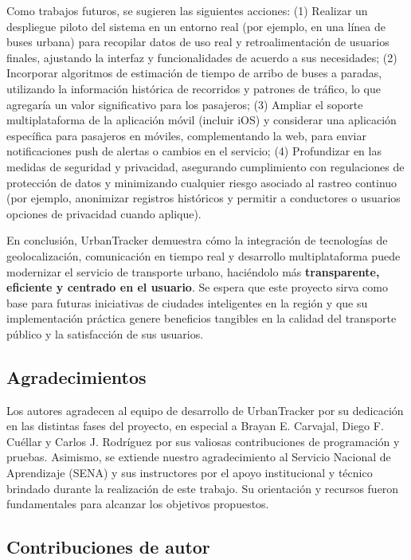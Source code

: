 \documentclass[
]{article}
\begin{document}
Como trabajos futuros, se sugieren las siguientes acciones: (1) Realizar
un despliegue piloto del sistema en un entorno real (por ejemplo, en una
línea de buses urbana) para recopilar datos de uso real y
retroalimentación de usuarios finales, ajustando la interfaz y
funcionalidades de acuerdo a sus necesidades; (2) Incorporar algoritmos
de estimación de tiempo de arribo de buses a paradas, utilizando la
información histórica de recorridos y patrones de tráfico, lo que
agregaría un valor significativo para los pasajeros; (3) Ampliar el
soporte multiplataforma de la aplicación móvil (incluir iOS) y
considerar una aplicación específica para pasajeros en móviles,
complementando la web, para enviar notificaciones push de alertas o
cambios en el servicio; (4) Profundizar en las medidas de seguridad y
privacidad, asegurando cumplimiento con regulaciones de protección de
datos y minimizando cualquier riesgo asociado al rastreo continuo (por
ejemplo, anonimizar registros históricos y permitir a conductores o
usuarios opciones de privacidad cuando aplique).

En conclusión, UrbanTracker demuestra cómo la integración de tecnologías
de geolocalización, comunicación en tiempo real y desarrollo
multiplataforma puede modernizar el servicio de transporte urbano,
haciéndolo más \textbf{transparente, eficiente y centrado en el
usuario}. Se espera que este proyecto sirva como base para futuras
iniciativas de ciudades inteligentes en la región y que su
implementación práctica genere beneficios tangibles en la calidad del
transporte público y la satisfacción de sus usuarios.

\subsection{Agradecimientos}\label{agradecimientos}

Los autores agradecen al equipo de desarrollo de UrbanTracker por su
dedicación en las distintas fases del proyecto, en especial a Brayan E.
Carvajal, Diego F. Cuéllar y Carlos J. Rodríguez por sus valiosas
contribuciones de programación y pruebas. Asimismo, se extiende nuestro
agradecimiento al Servicio Nacional de Aprendizaje (SENA) y sus
instructores por el apoyo institucional y técnico brindado durante la
realización de este trabajo. Su orientación y recursos fueron
fundamentales para alcanzar los objetivos propuestos.

\subsection{Contribuciones de autor}\label{contribuciones-de-autor}
\end{document}
